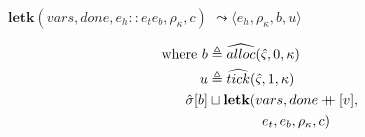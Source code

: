 \documentclass[12pt,draft]{article}
\newcommand\mdoubleplus{\ensuremath{\mathbin{+\mkern-9mu+}}}
\begin{document}
\begin{multicols*}{2}
\begin{align*}
\end{align*}
\begin{center}
  $\textbf{letk}(vars, done, e_h::e_t e_b , \rho_\kappa, c)$
  $\leadsto \langle e_h , \rho_\kappa , b , u \rangle$
\end{center}
\vspace{-7mm}
\begin{align*}
\text{where } b &\triangleq \widehat{alloc}(\hat{\varsigma}, 0, \kappa) \\
u &\triangleq \widehat{tick}(\hat{\varsigma}, 1, \kappa) \\
\hat{\sigma}[b] &\sqcup \textbf{letk}(vars, done \mdoubleplus [v], \\
&\;\;\;\;\;\;\;\;\;\;\;\;\;\; e_t , e_b , \rho_{\kappa} , c)
\end{align*}

\vfill\null
\columnbreak



\end{multicols*}
\end{document}
